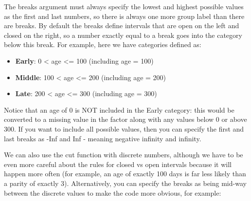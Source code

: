 \documentclass[
]{article}
\newenvironment{Shaded}{\begin{snugshade}}{\end{snugshade}}
\newcommand{\DataTypeTok}[1]{\textcolor[rgb]{0.13,0.29,0.53}{#1}}
\newcommand{\FloatTok}[1]{\textcolor[rgb]{0.00,0.00,0.81}{#1}}
\newcommand{\KeywordTok}[1]{\textcolor[rgb]{0.13,0.29,0.53}{\textbf{#1}}}
\newcommand{\NormalTok}[1]{#1}
\newcommand{\OperatorTok}[1]{\textcolor[rgb]{0.81,0.36,0.00}{\textbf{#1}}}
\newcommand{\StringTok}[1]{\textcolor[rgb]{0.31,0.60,0.02}{#1}}
\begin{document}
The breaks argument must always specify the lowest and highest possible
values as the first and last numbers, so there is always one more group
label than there are breaks. By default the breaks define intervals that
are open on the left and closed on the right, so a number exactly equal
to a break goes into the category below this break. For example, here we
have categories defined as:

\begin{itemize}
\item
  \textbf{Early}: 0 \textless{} age \textless= 100 (including age = 100)
\item
  \textbf{Middle}: 100 \textless{} age \textless= 200 (including age =
  200)
\item
  \textbf{Late}: 200 \textless{} age \textless= 300 (including age =
  300)
\end{itemize}

Notice that an age of 0 is NOT included in the Early category: this
would be converted to a missing value in the factor along with any
values below 0 or above 300. If you want to include all possible values,
then you can specify the first and last breaks as -Inf and Inf - meaning
negative infinity and infinity.

We can also use the cut function with discrete numbers, although we have
to be even more careful about the rules for closed vs open intervals
because it will happen more often (for example, an age of exactly 100
days is far less likely than a parity of exactly 3). Alternatively, you
can specify the breaks as being mid-way between the discrete values to
make the code more obvious, for example:

\begin{Shaded}
\end{Shaded}
\end{document}
